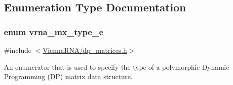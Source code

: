 \subsection{Enumeration Type Documentation}
\hypertarget{group__dp__matrices_ga6042ea1d58d01931e959791be6d89343}{
\subsubsection[{vrna\-\_\-mx\-\_\-type\-\_\-e}]{\setlength{\rightskip}{0pt plus 5cm}enum {\bf vrna\-\_\-mx\-\_\-type\-\_\-e}}}\label{group__dp__matrices_ga6042ea1d58d01931e959791be6d89343}


{\ttfamily \#include $<$\hyperlink{dp__matrices_8h}{Vienna\-R\-N\-A/dp\-\_\-matrices.\-h}$>$}



An enumerator that is used to specify the type of a polymorphic Dynamic Programming (D\-P) matrix data structure. 

